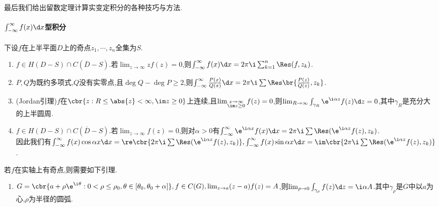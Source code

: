 \documentclass{article}
\begin{document}
\dayhrule

最后我们给出留数定理计算实变定积分的各种技巧与方法.

\paragraph{$\int_{-\infty}^{\infty}f(x)\d x$型积分}下设$f$在上半平面$D$上的奇点$z_1,\cdots,z_n$全集为$S$.
\begin{enumerate}
    \item $f\in H(D-S)\cap C(\overline{D}-S)$.若$\lim_{z\to\infty}zf(z)=0$,则$\int_{-\infty}^{\infty}f(x)\d x=2\pi\i\sum_{k=1}^n\Res(f,z_k)$.\\
    \item $P,Q$为既约多项式,$Q$没有实零点,且$\deg Q-\deg P\geq 2$,则$\int_{-\infty}^{\infty}\frac{P(x)}{Q(x)}\d x=2\pi\i\sum \Res\br{\frac{P(z)}{Q(z)},z_k}$.
    \item (Jordan引理)$f$在$\cbr{z:R\leq\abs{z}<\infty,\im z\geq 0}$上连续,且$\lim_{\substack{z\to \infty\\\im z\geq 0}}f(z)=0$,则$\lim_{R\to\infty}\int_{\gamma_R}\e^{\i\alpha z}f(z)\d z=0$,其中$\gamma_R$是充分大的上半圆周.
    \item $f\in H(D-S)\cap C(\overline{D}-S)$.若$\lim_{z\to\infty}f(z)=0$,则对$\alpha>0$有$\int_{-\infty}^{\infty}\e^{\i\alpha x}f(x)\d x=2\pi\i\sum\Res(\e^{\i\alpha z}f(z),z_k)$.\\
    因此我们有$\int_{-\infty}^{\infty}f(x)\cos \alpha x\d x=\re\cbr{2\pi\i\sum\Res(\e^{\i\alpha z}f(z),z_k)},\int_{-\infty}^{\infty}f(x)\sin \alpha x\d x=\im\cbr{2\pi\i\sum\Res(\e^{\i\alpha z}f(z),z_k)}$.
\end{enumerate}

若$f$在实轴上有奇点,则需要如下引理.
\begin{enumerate}[resume]
    \item $G=\cbr{a+\rho\e^{\i\theta}:0<\rho\leq \rho_0,\theta\in[\theta_0,\theta_0+\alpha]},f\in C(G),\lim_{z\to a}(z-a)f(z)=A$,则$\lim_{\rho\to 0}\int_{\gamma_\rho}f(z)\d z=\i\alpha A$.其中$\gamma_\rho$是$G$中以$a$为心,$\rho$为半径的圆弧.\\
\end{enumerate}
\end{document}
